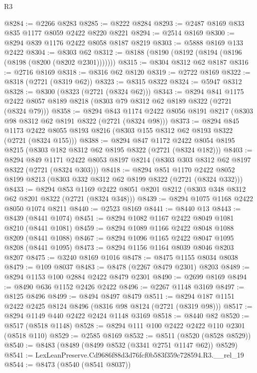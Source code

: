 \begin{lexlean}{R3}
\begin{coremodule}
@8284 := @2266 @8283
@8285 := @8222 @8284
@8293 := @2487 @8169 @833 @835 @1177 @8059 @2422 @8220 @8221
@8294 := @2514 @8169
@8300 := @8294 @839 @1176 @2422 @8058 @8187 @8219
@8303 := @5888 @8169 @133 @2422
@8304 := @8303 @62
@8312 := @8188 (@8190 (@8192 (@8194 (@8196 (@8198 (@8200 (@8202 @2301)))))))
@8315 := @8304 @8312 @62 @8187
@8316 := @2716 @8169
@8318 := @8316 @62 @8120
@8319 := @2722 @8169
@8322 := @8318 (@2721 (@8319 @62))
@8323 := @8315 @8322
@8324 := @5947 @8312
@8328 := @8300 (@8323 (@2721 (@8324 @62)))
@8343 := @8294
    @841
    @1175
    @2422
    @8057
    @8189
    @8218
    (@8303 @79 @8312 @62 @8189 @8322 (@2721 (@8324 @79)))
@8358 := @8294
    @843
    @1174
    @2422
    @8056
    @8191
    @8217
    (@8303 @98 @8312 @62 @8191 @8322 (@2721 (@8324 @98)))
@8373 := @8294
    @845
    @1173
    @2422
    @8055
    @8193
    @8216
    (@8303 @155 @8312 @62 @8193 @8322 (@2721 (@8324 @155)))
@8388 := @8294
    @847
    @1172
    @2422
    @8054
    @8195
    @8215
    (@8303 @182 @8312 @62 @8195 @8322 (@2721 (@8324 @182)))
@8403 := @8294
    @849
    @1171
    @2422
    @8053
    @8197
    @8214
    (@8303 @303 @8312 @62 @8197 @8322 (@2721 (@8324 @303)))
@8418 := @8294
    @851
    @1170
    @2422
    @8052
    @8199
    @8213
    (@8303 @332 @8312 @62 @8199 @8322 (@2721 (@8324 @332)))
@8433 := @8294
    @853
    @1169
    @2422
    @8051
    @8201
    @8212
    (@8303 @348 @8312 @62 @8201 @8322 (@2721 (@8324 @348)))
@8439 := @8294 @1075 @1168 @2422 @8050 @1074 @8211
@8440 := @2523 @8169
@8441 := @8440 @13
@8443 := @8439 (@8441 @1074)
@8451 := @8294 @1082 @1167 @2422 @8049 @1081 @8210 (@8441 @1081)
@8459 := @8294 @1089 @1166 @2422 @8048 @1088 @8209 (@8441 @1088)
@8467 := @8294 @1096 @1165 @2422 @8047 @1095 @8208 (@8441 @1095)
@8473 := @8294 @1156 @1164 @8039 @8046 @8203 @8207
@8475 := @3240 @8169 @1016
@8478 := @8475 @1155 @8034 @8038
@8479 := @109 @8037
@8483 := @8478 (@2267 @8479 @2301) @8203
@8489 := @8294 @1153 @100 @2884 @2422 @8479 @2301
@8490 := @2699 @8169
@8494 := @8490 @636 @1152 @2426 @2422
@8496 := @2267 @1148 @3169
@8497 := @8125 @8496
@8499 := @8494 @8497 @8479
@8511 := @8294 @187 @1151 @2422 @2425 @8124 @8496 (@8316 @98 @8124 (@2721 (@8319 @98)))
@8517 := @8294 @1149 @440 @2422 @2424 @1148 @3169
@8518 := @8440 @82
@8520 := @8517 (@8518 @1148)
@8528 := @8294 @111 @100 @2422 @2422 @110 @2301 (@8518 @110)
@8529 := @2585 @8169
@8532 := @8511 (@8520 (@8528 @8529))
@8540 := @8483 (@8489 (@8499 @8532 (@3341 @2751 @1147 @62)) @8529)
@8541 := LexLeanPreserve.Cd9686f88d3d76fcf0b583f359c728594.R3.__rel_19
@8544 := @8473 (@8540 (@8541 @8037))

\end{coremodule}
\end{lexlean}
